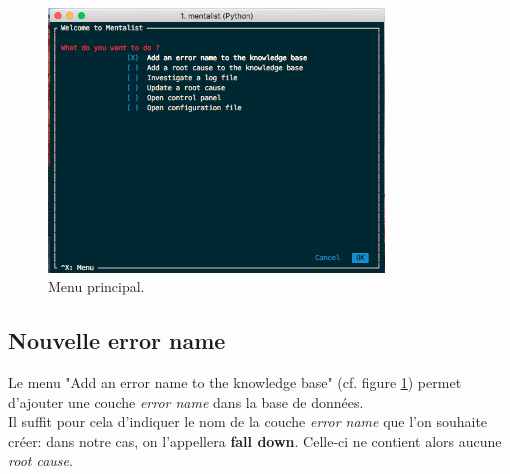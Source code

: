 \begin{figure}[H]
	\centering\includegraphics[height=7cm]{images/main_menu.png}
	\caption[Menu principal]{Menu principal.}
	\label{fig:Menu principal}
\end{figure} 

\subsection{Nouvelle error name}
\label{Industrialisation du produit: Utilisation suggérée des outils: Nouvelle error name}
Le menu "Add an error name to the knowledge base" (cf. figure \ref{fig:Menu principal}) permet d'ajouter une couche \emph{error name} dans la base de données. \\
Il suffit pour cela d'indiquer le nom de la couche \emph{error name} que l'on souhaite créer: dans notre cas, on l'appellera \textbf{fall down}. Celle-ci ne contient alors aucune \emph{root cause}.

